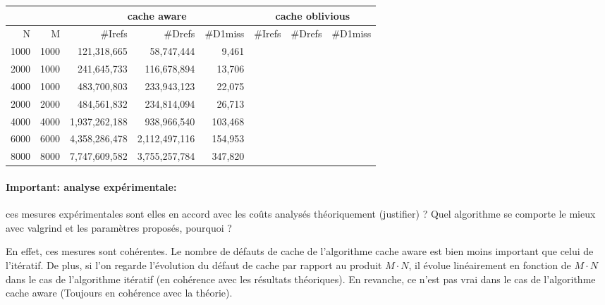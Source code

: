 \documentclass[10pt,a4paper]{article}
\begin{document}
\begin{center}
{\footnotesize
\begin{tabular}{|r|r||r|r|r||r|r|r||}
\hline
 \multicolumn{2}{|c||}{ } 
& \multicolumn{3}{c||}{cache aware}
& \multicolumn{3}{c||}{cache oblivious}
\\ \hline
N & M 
& \#Irefs & \#Drefs & \#D1miss %
& \#Irefs & \#Drefs & \#D1miss %
\\ \hline
\hline
1000 & 1000 
& 121,318,665 & 58,747,444 & 9,461 %
&  &  &   %
\\ \hline
2000 & 1000 
& 241,645,733 & 116,678,894 &  13,706 %
&  &  &   %
\\ \hline
4000 & 1000 
& 483,700,803 &  233,943,123 &  22,075 %
&  &  &   %
\\ \hline
2000 & 2000 
& 484,561,832 & 234,814,094 & 26,713  %
&  &  &   %
\\ \hline
4000 & 4000 
& 1,937,262,188 & 938,966,540 &  103,468 %
&  &  &   %
\\ \hline
6000 & 6000 
& 4,358,286,478 &  2,112,497,116 & 154,953  %
&  &  &   %
\\ \hline
8000 & 8000 
& 7,747,609,582 &  3,755,257,784 & 347,820  %
&  &  &   %
\\ \hline
\hline
\end{tabular}
}
\end{center}

\paragraph{Important: analyse expérimentale:} 
ces mesures expérimentales sont elles en accord avec les coûts analysés théoriquement (justifier)  ? 
Quel algorithme se comporte le mieux avec valgrind et 
les paramètres proposés, pourquoi ?

\vspace{0.1cm}
En effet, ces mesures sont cohérentes. Le nombre de défauts de cache de l'algorithme cache aware est bien moins important que celui de l'itératif. De plus, si l'on regarde l'évolution du défaut de cache par rapport au produit $M\cdot N$, il évolue linéairement en fonction de $M\cdot N$ dans le cas de l'algorithme itératif (en cohérence avec les résultats théoriques). En revanche, ce n'est pas vrai dans le cas de l'algorithme cache aware (Toujours en cohérence avec la théorie).
\end{document}

